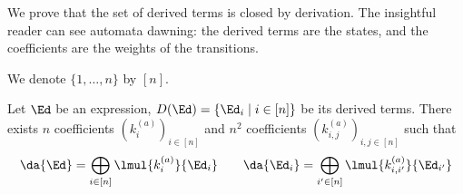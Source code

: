 \documentclass[a4paper,USenglish]{lipics}
\begin{document}
We prove that the set of derived terms is closed by derivation.  The
insightful reader can see automata dawning: the derived terms are the
states, and the coefficients are the weights of the transitions.
\begin{Lemma}
  \label{lem:dt:closed:letter}
  We denote $\{1, \ldots, n\}$ by $[n]$.

  Let $\Ed$ be an expression, $D(\Ed) = \{\Ed_i \mid i \in [n]\}$ be its
  derived terms.  There exists $n$ coefficients $(k_i^{(a)})_{i\in[n]}$ and
  $n^2$ coefficients $(k_{i,j}^{(a)})_{i,j\in[n]}$ such that
  \begin{gather*}
    \da{\Ed}   = \bigoplus_{i\in[n]} \lmul{k_i^{(a)}}{\Ed_i}
    \qquad
    \da{\Ed_i} = \bigoplus_{i'\in[n]} \lmul{k_{i,i'}^{(a)}}{\Ed_{i'}}
  \end{gather*}
\end{Lemma}
\end{document}

